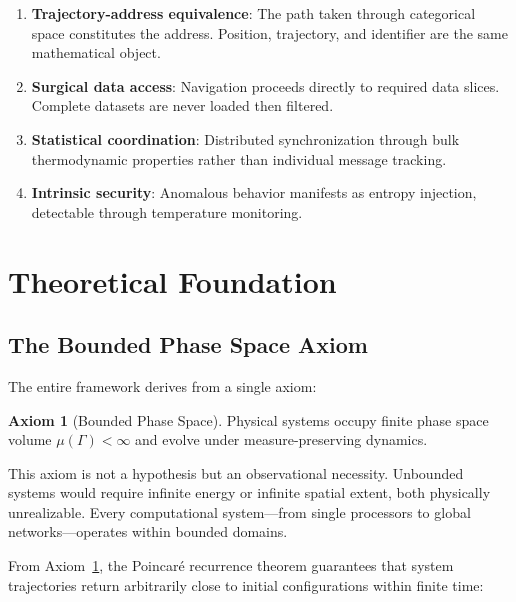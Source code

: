 \documentclass[10pt,twocolumn]{article}
\theoremstyle{definition}
\newtheorem{axiom}[theorem]{Axiom}
\theoremstyle{remark}
\begin{document}
\begin{enumerate}[nosep]
\item \textbf{Trajectory-address equivalence}: The path taken through categorical space constitutes the address. Position, trajectory, and identifier are the same mathematical object.

\item \textbf{Surgical data access}: Navigation proceeds directly to required data slices. Complete datasets are never loaded then filtered.

\item \textbf{Statistical coordination}: Distributed synchronization through bulk thermodynamic properties rather than individual message tracking.

\item \textbf{Intrinsic security}: Anomalous behavior manifests as entropy injection, detectable through temperature monitoring.
\end{enumerate}

\section{Theoretical Foundation}
\label{sec:foundation}

\subsection{The Bounded Phase Space Axiom}

The entire framework derives from a single axiom:

\begin{axiom}[Bounded Phase Space]
\label{axiom:bounded}
Physical systems occupy finite phase space volume $\mu(\Gamma) < \infty$ and evolve under measure-preserving dynamics.
\end{axiom}

This axiom is not a hypothesis but an observational necessity. Unbounded systems would require infinite energy or infinite spatial extent, both physically unrealizable. Every computational system---from single processors to global networks---operates within bounded domains.

From Axiom~\ref{axiom:bounded}, the Poincar\'{e} recurrence theorem \cite{poincare1890} guarantees that system trajectories return arbitrarily close to initial configurations within finite time:
\end{document}
